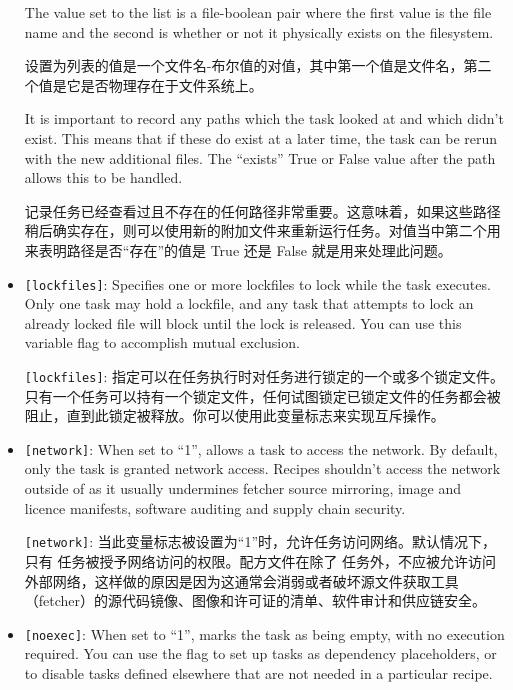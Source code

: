 \begin{itemize}
\medskip
The value set to the list is a file-boolean pair where the first value is the file name and the second is whether or not it physically exists on the filesystem.

\medskip
设置为列表的值是一个文件名-布尔值的对值，其中第一个值是文件名，第二个值是它是否物理存在于文件系统上。

\medskip
{}

\medskip
It is important to record any paths which the task looked at and which didn't exist. This means that if these do exist at a later time, the task can be rerun with the new additional files. The ``exists'' True or False value after the path allows this to be handled.

\medskip
记录任务已经查看过且不存在的任何路径非常重要。这意味着，如果这些路径稍后确实存在，则可以使用新的附加文件来重新运行任务。对值当中第二个用来表明路径是否``存在''的值是 True 还是 False 就是用来处理此问题。

\medskip
\item \texttt{[lockfiles]}: Specifies one or more lockfiles to lock while the task executes. Only one task may hold a lockfile, and any task that attempts to lock an already locked file will block until the lock is released. You can use this variable flag to accomplish mutual exclusion.

\medskip
\texttt{[lockfiles]}: 指定可以在任务执行时对任务进行锁定的一个或多个锁定文件。只有一个任务可以持有一个锁定文件，任何试图锁定已锁定文件的任务都会被阻止，直到此锁定被释放。你可以使用此变量标志来实现互斥操作。

\item \texttt{[network]}: When set to ``1'', allows a task to access the network. By default, only the  task is granted network access. Recipes shouldn't access the network outside of  as it usually undermines fetcher source mirroring, image and licence manifests, software auditing and supply chain security.

\medskip
\texttt{[network]}: 当此变量标志被设置为``1''时，允许任务访问网络。默认情况下，只有  任务被授予网络访问的权限。配方文件在除了  任务外，不应被允许访问外部网络，这样做的原因是因为这通常会消弱或者破坏源文件获取工具（fetcher）的源代码镜像、图像和许可证的清单、软件审计和供应链安全。

\item \texttt{[noexec]}: When set to ``1'', marks the task as being empty, with no execution required. You can use the \code{[noexec]} flag to set up tasks as dependency placeholders, or to disable tasks defined elsewhere that are not needed in a particular recipe.


\end{itemize}
